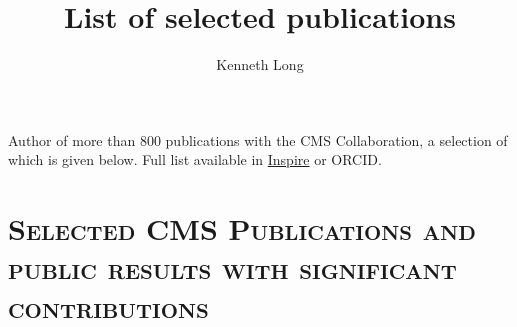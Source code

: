 \documentclass[a4paper]{article}
\begin{document}
\title{List of selected publications}
\author{Kenneth Long }

\maketitle

\noindent Author of more than 800 publications with the CMS Collaboration, a selection of which is given below. Full list available in \href{https://inspirehep.net/authors/1280606}{Inspire} or ORCID. \\

\section{\textsc{Selected CMS Publications and public results with significant contributions}}
\end{document}
